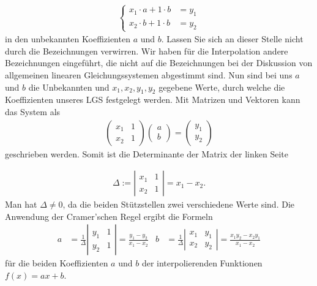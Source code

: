 \begin{bsp}
\begin{align*}
\left\{
\begin{matrix}
x_1 \cdot a + 1 \cdot b & = y_1
\\ x_2 \cdot b + 1 \cdot b & = y_2
\end{matrix} 
\right.
\end{align*}	
in den unbekannten Koeffizienten  $a$ und $b$. Lassen Sie sich an dieser Stelle nicht durch die Bezeichnungen verwirren. Wir haben für die Interpolation andere Bezeichnungen eingeführt, die nicht auf die Bezeichnungen bei der Diskussion von allgemeinen linearen Gleichungssystemen abgestimmt sind. Nun sind bei uns $a$ und $b$ die Unbekannten und $x_1,x_2,y_1, y_2$ gegebene Werte, durch welche die Koeffizienten unseres LGS festgelegt werden. Mit Matrizen und Vektoren kann das System als 
	\begin{align*}
\begin{pmatrix}
x_1 & 1 \\
x_2 & 1
\end{pmatrix}
\begin{pmatrix}
a \\ b
\end{pmatrix}
= \begin{pmatrix}
y_1 \\ y_2
\end{pmatrix}	
\end{align*}
geschrieben werden. Somit ist die Determinante der Matrix der linken Seite 
		
	\begin{align*}
		\Delta := \left| \begin{matrix}
			x_1 & 1 \\
			x_2 & 1
		\end{matrix} \right| = x_1 - x_2.
	\end{align*}
	Man hat $\Delta \ne 0$, da die beiden Stützstellen zwei verschiedene Werte sind. Die Anwendung der Cramer'schen Regel ergibt die Formeln
	\begin{align*}
		a &= \frac{1}{\Delta}   \left| \begin{matrix}
		y_1 & 1 \\
		y_2 & 1
		\end{matrix} \right| = \frac{y_1 - y_2}{x_1 - x_2} & b &= \frac{1}{\Delta} \left| \begin{matrix}
		x_1 & y_1 \\
		x_2 & y_2
		\end{matrix} \right| = \frac{x_1y_2 - x_2y_1}{x_1 - x_2}
	\end{align*}
	für die beiden Koeffizienten $a$ und $b$ der interpolierenden Funktionen $f(x) = a x+ b$. 
\end{bsp}

